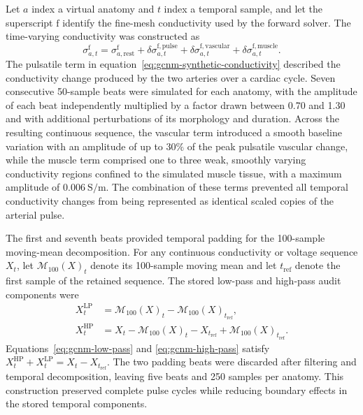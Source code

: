 \documentclass[11pt]{article}
\begin{document}
Let $a$ index a virtual anatomy and $t$ index a temporal sample, and let the superscript $\mathrm f$ identify the fine-mesh conductivity used by the forward solver.
The time-varying conductivity was constructed as
\begin{equation}
    \sigma^{\mathrm f}_{a,t}
    =
    \sigma^{\mathrm f}_{a,\mathrm{rest}}
    +\delta\sigma^{\mathrm f,\mathrm{pulse}}_{a,t}
    +\delta\sigma^{\mathrm f,\mathrm{vascular}}_{a,t}
    +\delta\sigma^{\mathrm f,\mathrm{muscle}}_{a,t}.
\label{eq:gcnm-synthetic-conductivity}
\end{equation}
The pulsatile term in equation~\eqref{eq:gcnm-synthetic-conductivity} described the conductivity change produced by the two arteries over a cardiac cycle.
Seven consecutive 50-sample beats were simulated for each anatomy, with the amplitude of each beat independently multiplied by a factor drawn between 0.70 and 1.30 and with additional perturbations of its morphology and duration.
Across the resulting continuous sequence, the vascular term introduced a smooth baseline variation with an amplitude of up to $30\%$ of the peak pulsatile vascular change, while the muscle term comprised one to three weak, smoothly varying conductivity regions confined to the simulated muscle tissue, with a maximum amplitude of $0.006~\mathrm{S/m}$.
The combination of these terms prevented all temporal conductivity changes from being represented as identical scaled copies of the arterial pulse.

The first and seventh beats provided temporal padding for the 100-sample moving-mean decomposition.
For any continuous conductivity or voltage sequence $X_t$, let $\mathcal M_{100}(X)_t$ denote its 100-sample moving mean and let $t_{\mathrm{ref}}$ denote the first sample of the retained sequence.
The stored low-pass and high-pass audit components were
\begin{subequations}
\label{eq:gcnm-temporal-components}
\begin{align}
    X^{\mathrm{LP}}_t
    &=
    \mathcal M_{100}(X)_t-\mathcal M_{100}(X)_{t_{\mathrm{ref}}},
    \label{eq:gcnm-low-pass}\\
    X^{\mathrm{HP}}_t
    &=
    X_t-\mathcal M_{100}(X)_t
    -X_{t_{\mathrm{ref}}}
    +\mathcal M_{100}(X)_{t_{\mathrm{ref}}}.
    \label{eq:gcnm-high-pass}
\end{align}
\end{subequations}
Equations~\eqref{eq:gcnm-low-pass} and \eqref{eq:gcnm-high-pass} satisfy $X^{\mathrm{HP}}_t+X^{\mathrm{LP}}_t=X_t-X_{t_{\mathrm{ref}}}$.
The two padding beats were discarded after filtering and temporal decomposition, leaving five beats and 250 samples per anatomy.
This construction preserved complete pulse cycles while reducing boundary effects in the stored temporal components.
\end{document}
